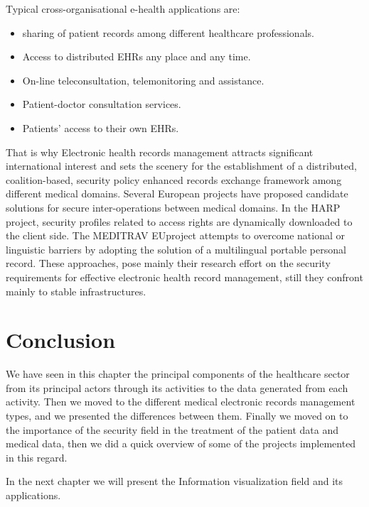 \bigbreak
Typical cross-organisational e-health applications are\cite{ruotsalainenCrossplatformModelSecure2004}: 
\begin{itemize}
\renewcommand{\labelitemi}{$\bullet$}
\item sharing of patient records among different healthcare professionals. 
\item Access to distributed EHRs any place and any time. 
\item On-line teleconsultation, telemonitoring and assistance. 
\item Patient-doctor consultation services.
\item Patients’ access to their own EHRs.
\end{itemize}

\bigbreak
That is why Electronic health records management attracts significant international interest and sets the scenery for the establishment of a distributed, coalition-based, security policy enhanced records exchange framework among different medical domains. Several European projects have proposed candidate solutions for secure inter-operations between medical domains. In the HARP project, security profiles related to access rights are dynamically downloaded to the client side. The MEDITRAV EUproject attempts to overcome national or linguistic barriers by adopting the solution of a multilingual portable personal record. These approaches, pose mainly their research effort on the security requirements for effective electronic health record management, still they confront mainly to stable infrastructures\cite{belsisPervasiveSecureElectronic2005}.

\section{Conclusion}
We have seen in this chapter the principal components of the healthcare sector from its principal actors through its activities to the data generated from each activity. Then we moved to the different medical electronic records management types, and we presented the differences between them. Finally we moved on to the importance of the security field in the treatment of the patient data and medical data, then we did a quick overview of some of the projects implemented in this regard.


In the next chapter we will present the Information visualization field and its applications.
